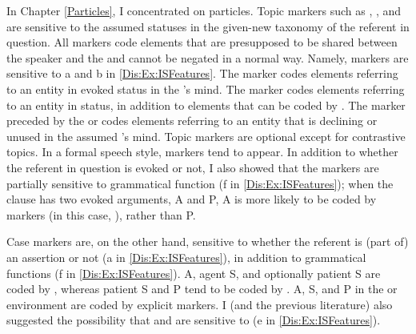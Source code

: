 In Chapter \ref{Particles},
I concentrated on particles.
Topic markers such as , , and 
are sensitive to the assumed statuses in the given-new taxonomy of the referent in question.
All  markers code elements that are presupposed to be
shared between the speaker and the 
and cannot be negated in a normal way.
Namely,  markers are sensitive to
a and b in \ref{Dis:Ex:ISFeatures}.
The marker  codes elements referring to an entity in evoked status in the 's mind.
The marker  codes elements referring to an entity in  status,
in addition to elements that can be coded by .
The marker  preceded by the   or 
codes elements referring to an entity that is declining or unused in the assumed 's mind.
Topic markers are optional except for contrastive topics.
In a formal speech style,
 markers tend to appear.
In addition to whether the referent in question is evoked or not,
I also showed that the  markers are partially sensitive to grammatical function (f in \ref{Dis:Ex:ISFeatures});
when the clause has two evoked arguments, A and P,
A is more likely to be coded by  markers (in this case, ),
rather than P.

Case markers are, on the other hand, sensitive to whether the referent is (part of) an assertion or not (a in \ref{Dis:Ex:ISFeatures}),
in addition to grammatical functions (f in \ref{Dis:Ex:ISFeatures}).
A, agent S, and optionally patient S are coded by ,
whereas patient S and P tend to be coded by \ci{\O}.
A, S, and P in the  or  environment are coded by explicit markers.
I (and the previous literature) also suggested the possibility that
 and  are sensitive to  (e in \ref{Dis:Ex:ISFeatures}).

